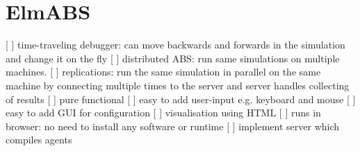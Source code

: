 \chapter{ElmABS}

[ ] time-traveling debugger: can move backwards and forwards in the simulation and change it on the fly
[ ] distributed ABS: run same simulations on multiple machines. 
[ ] replications: run the same simulation in parallel on the same machine by connecting multiple times to the server and server handles collecting of results
[ ] pure functional
[ ] easy to add user-input e.g. keyboard and mouse
[ ] easy to add GUI for configuration
[ ] visualisation using HTML 
[ ] runs in browser: no need to install any software or runtime
[ ] implement server which compiles agents